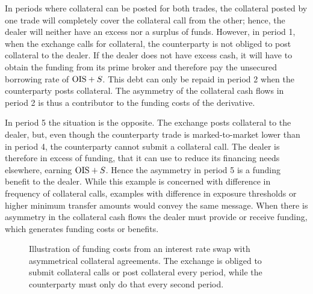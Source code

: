 \documentclass[main.tex]{subfiles}
\begin{document}
        In periods where collateral can be posted for both trades, 
        the collateral posted by one trade will completely cover the collateral call from the other;
        hence, the dealer will neither have an excess nor a surplus of funds.
        However, in period 1, when the exchange calls for collateral,
        the counterparty is not obliged to post collateral to the dealer. 
        If the dealer does not have excess cash, 
        it will have to obtain the funding from its prime broker 
        and therefore pay the unsecured borrowing rate of $\OIS/ + S$. 
        This debt can only be repaid in period 2 when the counterparty posts collateral.
        The asymmetry of the collateral cash flows in period 2
        is thus a contributor to the funding costs of the derivative.

        In period 5 the situation is the opposite.
        The exchange posts collateral to the dealer, 
        but, even though the counterparty trade is marked-to-market lower than in period 4,
        the counterparty cannot submit a collateral call. 
        The dealer is therefore in excess of funding,
        that it can use to reduce its financing needs elsewhere, earning $\OIS/ + S$.
        Hence the asymmetry in period 5 is a funding benefit to the dealer.
        While this example is concerned with difference in frequency of collateral calls,
        examples with difference in exposure thresholds or higher minimum transfer amounts 
        would convey the same message.
        When there is asymmetry in the collateral cash flows the dealer must provide or receive funding,
        which generates funding costs or benefits.

        \begin{figure}
            \centering
            \resizebox{\textwidth}{!}{%
            \begin{tikzpicture}
                
            \end{tikzpicture}        
            }   
            \caption{
                Illustration of funding costs from an interest rate swap with asymmetrical collateral agreements.
                The exchange is obliged to submit collateral calls or post collateral every period,
                while the counterparty must only do that every second period.
            }
            \label{fig:funding-costs-asymmetrical-csa}
        \end{figure}
\end{document}
